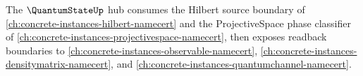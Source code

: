 The $\QuantumStateUp$ hub consumes the Hilbert source boundary of \autoref{ch:concrete-instances-hilbert-namecert} and the ProjectiveSpace phase classifier of \autoref{ch:concrete-instances-projectivespace-namecert}, then exposes readback boundaries to \autoref{ch:concrete-instances-observable-namecert}, \autoref{ch:concrete-instances-densitymatrix-namecert}, and \autoref{ch:concrete-instances-quantumchannel-namecert}.




